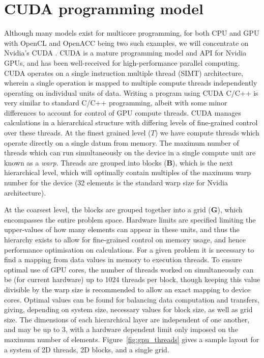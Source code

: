 \section{CUDA programming model}\label{sec:cuda_prog}
Although many models exist for multicore programming, for both CPU and GPU with OpenCL and OpenACC being two such examples, we will concentrate on Nvidia's CUDA \cite{NUM:Nickolls_cuda_2008}. CUDA is a mature programming model and API for Nvidia GPUs, and has been well-received for high-performance parallel computing. CUDA operates on a single instruction multiple thread (SIMT) architecture, wherein a single operation is mapped to multiple compute threads independently operating on individual units of data. Writing a program using CUDA C/C++ is very similar to standard C/C++ programming, albeit with some minor differences to account for control of GPU compute threads. CUDA manages calculations in a hierarchical structure with differing levels of fine-grained control over these threads. At the finest grained level ($T$) we have compute threads which operate directly on a single datum from memory. The maximum number of threads which can run simultaneously on the device in a single compute unit are known as a \textit{warp}. Threads are grouped into blocks ($\mathbf{B}$), which is the next hierarchical level, which will optimally contain multiples of the maximum warp number for the device (32 elements is the standard warp size for Nvidia architecture).

At the coarsest level, the blocks are grouped together into a grid ($\mathbf{G}$), which encompasses the entire problem space. Hardware limits are specified limiting the upper-values of how many elements can appear in these units, and thus the hierarchy exists to allow for fine-grained control on memory usage, and hence performance optimisation on calculations. For a given problem it is necessary to find a mapping from data values in memory to execution threads. To ensure optimal use of GPU cores, the number of threads worked on simultaneously can be (for current hardware) up to 1024 threads per block, though keeping this value divisible by the warp size is recommended to allow an exact mapping to device cores. Optimal values can be found for balancing data computation and transfers, giving, depending on system size, necessary values for block size, as well as grid size. The dimensions of each hierarchical layer are independent of one another, and may be up to 3, with a hardware dependent limit only imposed on the maximum number of elements. Figure~\ref{fig:gpu_threads} gives a sample layout for a system of 2D threads, 2D blocks, and a single grid.

